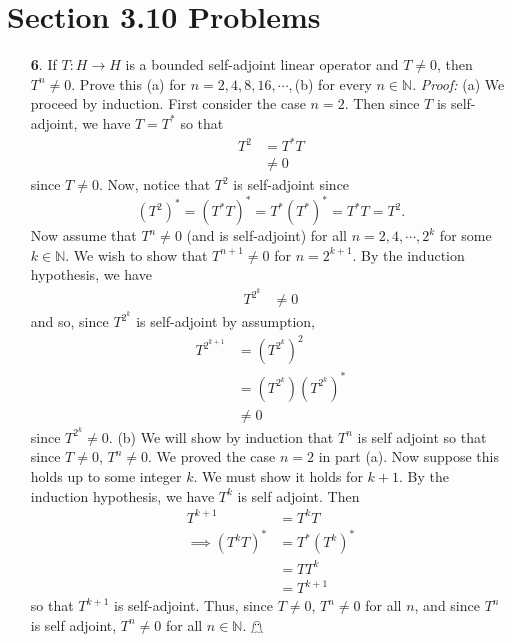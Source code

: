 \documentclass{article}
\begin{document}
\section*{Section 3.10 Problems}
\begin{itemize}
    \item[\textbf{6}.] If $T: H \to H$ is a bounded self-adjoint linear operator and $T \neq 0$, then $T^n \neq 0$. Prove this (a) for $n = 2,4,8,16,\cdots,$(b) for every $n \in \mathbb{N}$.
    \newline\newline
    \textit{Proof:} (a) We proceed by induction. First consider the case $n = 2$. Then since $T$ is self-adjoint, we have $T = T^*$ so that
    \begin{align*}
        T^2 &= T^*T\\
        &\neq 0
    \end{align*}
    since $T \neq 0$. Now, notice that $T^2$ is self-adjoint since
    \[(T^2)^* = (T^*T)^* = T^*(T^*)^* = T^*T = T^2.\]
    Now assume that $T^n \neq 0$ (and is self-adjoint) for all $n = 2, 4, \cdots, 2^k$ for some $k \in \mathbb{N}$. We wish to show that $T^{n+1} \neq 0$ for $n = 2^{k+1}$. By the induction hypothesis, we have
    \begin{align*}
        T^{2^k} &\neq 0
    \end{align*}
    and so, since $T^{2^k}$ is self-adjoint by assumption,
    \begin{align*}
        T^{2^{k+1}} &= \left(T^{2^{k}}\right)^2\\
        &= \left(T^{2^k}\right)\left(T^{2^k}\right)^*\\
        &\neq 0
    \end{align*}
    since $T^{2^k} \neq 0$. 
    \newline\newline
    (b) We will show by induction that $T^n$ is self adjoint so that since $T \neq 0$, $T^n \neq 0$. We proved the case $n = 2$ in part (a). Now suppose this holds up to some integer $k$. We must show it holds for $k+1$. By the induction hypothesis, we have $T^k$ is self adjoint. Then
    \begin{align*}
        T^{k+1} &= T^kT\\
        \implies (T^kT)^* &= T^*(T^k)^*\\
        &= TT^k\\
        &= T^{k+1}
    \end{align*}
    so that $T^{k+1}$ is self-adjoint. Thus, since $T \neq 0$, $T^n \neq 0$ for all $n$, and since $T^n$ is self adjoint, $T^n \neq 0$ for all $n \in \mathbb{N}$. \hfill $\mathghost$
\end{itemize}
\end{document}
